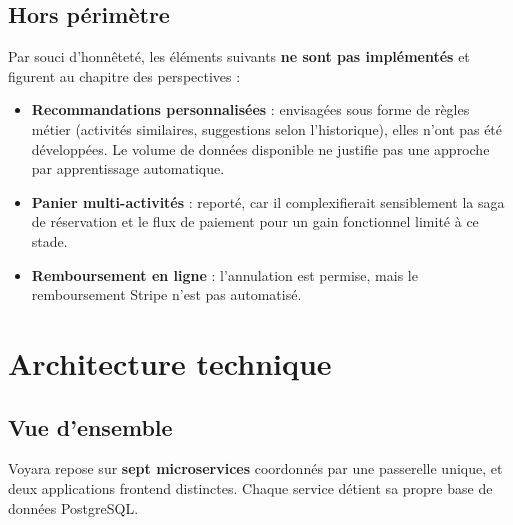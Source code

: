 \documentclass[11pt,a4paper]{report}
\begin{document}
\section{Hors périmètre}

Par souci d'honnêteté, les éléments suivants \textbf{ne sont pas implémentés} et
figurent au chapitre des perspectives :

\begin{itemize}
  \item \textbf{Recommandations personnalisées} : envisagées sous forme de
    règles métier (activités similaires, suggestions selon l'historique), elles
    n'ont pas été développées. Le volume de données disponible ne justifie pas
    une approche par apprentissage automatique.
  \item \textbf{Panier multi-activités} : reporté, car il complexifierait
    sensiblement la saga de réservation et le flux de paiement pour un gain
    fonctionnel limité à ce stade.
  \item \textbf{Remboursement en ligne} : l'annulation est permise, mais le
    remboursement Stripe n'est pas automatisé.
\end{itemize}

\chapter{Architecture technique}

\section{Vue d'ensemble}

Voyara repose sur \textbf{sept microservices} coordonnés par une passerelle
unique, et deux applications frontend distinctes. Chaque service détient sa
propre base de données PostgreSQL.

\vspace{6pt}
\end{document}
